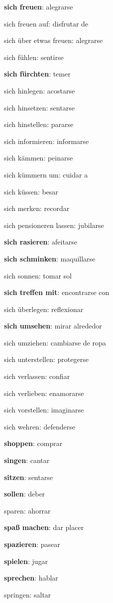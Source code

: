 \begin{multicols}{2}
\begin{myitemize}
\item \textbf{sich freuen}: alegrarse
\item sich freuen auf: disfrutar de
\item sich über etwas freuen: alegrarse
\item sich fühlen: sentirse
\item \textbf{sich fürchten}: temer
\item sich hinlegen: acostarse
\item sich hinsetzen: sentarse
\item sich hinstellen: pararse
\item sich informieren: informarse
\item sich kämmen: peinarse
\item sich kümmern um: cuidar a
\item sich küssen: besar
\item sich merken: recordar
\item sich pensioneren lassen: jubilarse
\item \textbf{sich rasieren}: afeitarse
\item \textbf{sich schminken}: maquillarse
\item sich sonnen: tomar sol
\item \textbf{sich treffen mit}: encontrarse con
\item sich überlegen: reflexionar
\item \textbf{sich umsehen}: mirar alrededor
\item sich umziehen: cambiarse de ropa
\item sich unterstellen: protegerse
\item sich verlassen: confiar
\item sich verlieben: enamorarse
\item sich vorstellen: imaginarse
\item sich wehren: defenderse
\item \textbf{shoppen}: comprar
\item \textbf{singen}: cantar
\item \textbf{sitzen}: sentarse
\item \textbf{sollen}: deber
\item sparen: ahorrar
\item \textbf{spaß machen}: dar placer
\item \textbf{spazieren}: pasear
\item \textbf{spielen}: jugar
\item \textbf{sprechen}: hablar
\item springen: saltar

\end{myitemize}
\end{multicols}
